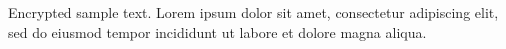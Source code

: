 \documentclass{article}
\begin{document}
Encrypted sample text. Lorem ipsum dolor sit amet, consectetur adipiscing
elit, sed do eiusmod tempor incididunt ut labore et dolore magna aliqua.
\end{document}
